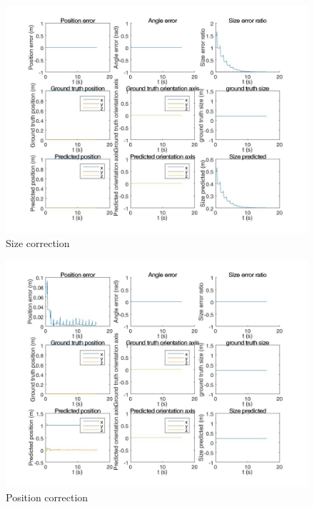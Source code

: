 \begin{figure}
  \includegraphics[width=1.2\textwidth,trim = 0mm 0mm 0mm 0mm,clip]{./Figures/observer_error_stationary_size.jpg}
  \caption{Size correction}
\end{figure}

\begin{figure}
  \includegraphics[width=1.2\textwidth,trim = 0mm 0mm 0mm 0mm,clip]{./Figures/observer_error_stationary_position.jpg}
  \caption{Position correction}
\end{figure}

	
